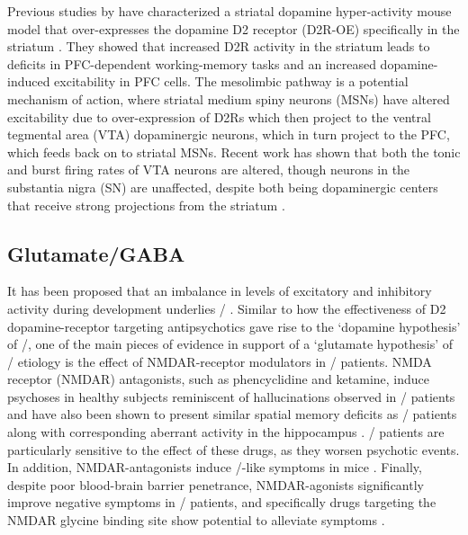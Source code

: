 Previous studies by \citeauthor{Kellendonk2006} have characterized a striatal dopamine hyper-activity mouse model that over-expresses the dopamine D2 receptor (D2R-OE) specifically in the striatum \citep{Kellendonk2006}.
They showed that increased D2R activity in the striatum leads to deficits in \ac{PFC}-dependent working-memory tasks and an increased dopamine-induced excitability in \ac{PFC} cells.
The mesolimbic pathway is a potential mechanism of action, where striatal medium spiny neurons (MSNs) have altered excitability due to over-expression of D2Rs which then project to the ventral tegmental area (VTA) dopaminergic neurons, which in turn project to the \ac{PFC}, which feeds back on to striatal MSNs.
Recent work has shown that both the tonic and burst firing rates of VTA neurons are altered, though neurons in the substantia nigra (SN) are unaffected, despite both being dopaminergic centers that receive strong projections from the striatum \citep{Krabbe2015}.



\subsection{Glutamate/GABA}
\label{sec:intro:scz:glutamate}
It has been proposed that an imbalance in levels of excitatory and inhibitory activity during development underlies \scz/ \citep{Insel2010a, Coyle2006, Yizhar2011}.
Similar to how the effectiveness of D2 dopamine-receptor targeting antipsychotics gave rise to the `dopamine hypothesis' of \scz/, one of the main pieces of evidence in support of a `glutamate hypothesis' of \scz/ etiology is the effect of NMDAR-receptor modulators in \scz/ patients.
NMDA receptor (NMDAR) antagonists, such as phencyclidine and ketamine, induce psychoses in healthy subjects reminiscent of hallucinations observed in \scz/ patients \citep{Javitt1991, Krystal1994} and have also been shown to present similar spatial memory deficits as \scz/ patients along with corresponding aberrant activity in the hippocampus \citep{Morgan2014}.
\Scz/ patients are particularly sensitive to the effect of these drugs, as they worsen psychotic events.
In addition, NMDAR-antagonists induce \scz/-like symptoms in mice \citep{Inta2010}.
Finally, despite poor blood-brain barrier penetrance, NMDAR-agonists significantly improve negative symptoms in \scz/ patients, and specifically drugs targeting the NMDAR glycine binding site show potential to alleviate symptoms \citep{Tsai1998, Coyle2012}.

